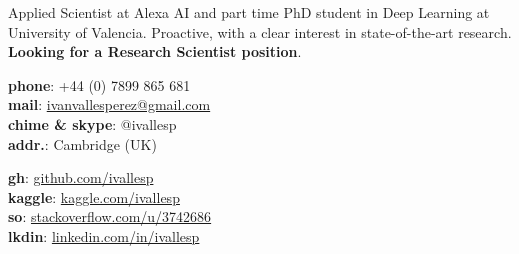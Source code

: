 \documentclass{resume} %
\begin{document}
\noindent

\printname
\vspace{5pt}

\begin{minipage}[t]{.38\textwidth}
	\raggedright


Applied Scientist at Alexa AI and part time PhD student in Deep Learning at University of Valencia. Proactive, with a clear interest in state-of-the-art research.\\ 
\textbf{Looking for a Research Scientist position}.

\end{minipage}\hspace{.05\textwidth}
\begin{minipage}[t]{.27\textwidth}
	\raggedright
	{\textbf{phone}: +44 (0) 7899 865 681 \\
	\textbf{mail}: \href{mailto:ivanvallesperez@gmail.com}{ivanvallesperez@gmail.com}\\
	\textbf{chime \& skype}: @ivallesp \\
	\textbf{addr.}: Cambridge (UK)
}
\end{minipage}\hspace{.03\textwidth}
\begin{minipage}[t]{.27\textwidth}
	\raggedright
	{ \textbf{gh}: \href{https://www.github.com/ivallesp}{github.com/ivallesp}  \\
	  \textbf{kaggle}: \href{https://www.kaggle.com/ivallesp}{kaggle.com/ivallesp}  \\
	  \textbf{so}: \href{https://stackoverflow.com/users/3742686/ivallesp}{stackoverflow.com/u/3742686} \\
	  \textbf{lkdin}: \href{https://www.linkedin.com/in/ivallesp}{linkedin.com/in/ivallesp}
	}
\end{minipage}


\end{document}

